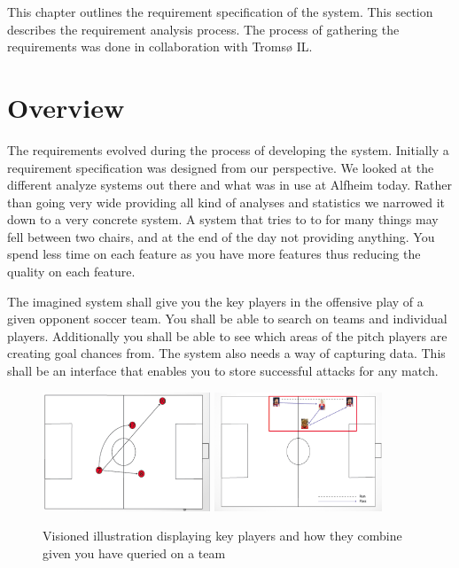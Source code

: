 This chapter outlines the requirement specification of the system. This section describes the requirement analysis process. The process of gathering the requirements was done in collaboration with Tromsø IL.

\section{Overview}

The requirements evolved during the process of developing the system. Initially a requirement specification was designed from our perspective. We looked at the different analyze systems out there and what was in use at Alfheim today. Rather than going very wide providing all kind of analyses and statistics we narrowed it down to a very concrete system. A system that tries to to for many things may fell between two chairs, and at the end of the day not providing anything. You spend less time on each feature as you have more features thus reducing the quality on each feature.

The imagined system shall give you the key players in the offensive play of a given opponent soccer team. You shall be able to search on teams and individual players. Additionally you shall be able to see which areas of the pitch players are creating goal chances from. The system also needs a way of capturing data. This shall be an interface that enables you to store successful attacks for any match.

\begin{figure}[ht!]
\centering
\includegraphics[width=50mm]{images/general/illustration_after_search2.png}
\includegraphics[width=50mm]{images/general/illustration_after_search.png}
\caption{Visioned illustration displaying key players and how they combine given you have queried on a team}
\end{figure}

